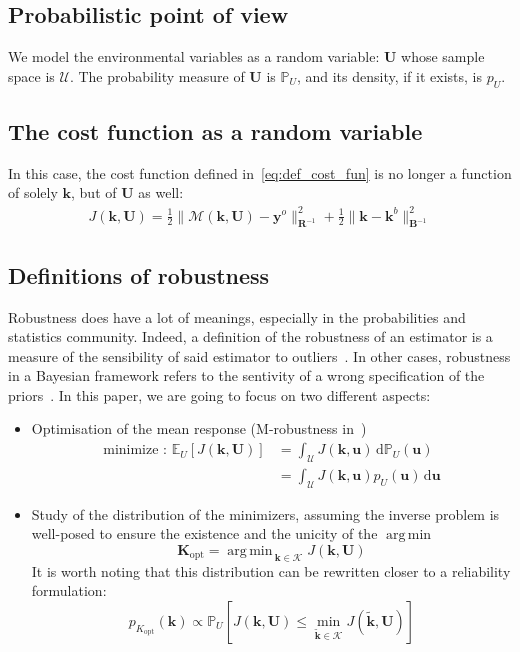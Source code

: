 \documentclass[npg]{copernicus}
\newcommand{\yobs}{\mathbf{y}^o}
\DeclareMathOperator*{\argmin}{arg\,min \,}
\newcommand{\Ex}{\mathbb{E}}
\newcommand{\Prob}{\mathbb{P}}
\begin{document}
\subsection{Probabilistic point of view}
We model the environmental variables as a random variable: $\mathbf{U}$ whose sample space is $\mathcal{U}$. The probability measure of $\mathbf{U}$ is $\Prob_U$, and its density, if it exists, is $p_U$.
\subsection{The cost function as a random variable}
In this case, the cost function defined in~\eqref{eq:def_cost_fun} is no longer a function of solely $\mathbf{k}$, but of $\mathbf{U}$ as well:
\begin{align}
  \label{eq:def_cost_fun_rnd}
  J(\mathbf{k},\mathbf{U}) = \frac12 \| \mathcal{M}(\mathbf{k},\mathbf{U}) - \yobs \|^2_{\mathbf{R}^{-1}} + \frac12\|\mathbf{k}-\mathbf{k}^b\|_{\mathbf{B}^{-1}}^2 
\end{align}

\subsection{Definitions of robustness}
Robustness does have a lot of meanings, especially in the probabilities and statistics community. Indeed, a definition of the robustness of an estimator is a measure of the sensibility of said estimator to outliers~\citep{huber_robust_2011}. In other cases, robustness in a Bayesian framework refers to the sentivity of a wrong specification of the priors~\citep{berger_overview_1994}.
In this paper, we are going to focus on two different aspects:
\begin{itemize}
\item Optimisation of the mean response (M-robustness in~\cite{lehman_designing_2004})
  \begin{align}
    \label{eq:def_opt_mean}
    \text{minimize : } \Ex_U\left[J(\mathbf{k},\mathbf{U})\right] &= \int_{\mathcal{U}} J(\mathbf{k},\mathbf{u}) \,\mathrm{d}\Prob_U(\mathbf{u})\\
                                                                  &= \int_{\mathcal{U}} J(\mathbf{k},\mathbf{u})p_U(\mathbf{u}) \,\mathrm{d}\mathbf{u}
  \end{align}
\item Study of the distribution of the minimizers, assuming the inverse problem is well-posed to ensure the existence and the unicity of the $\argmin$
  \begin{equation}
    \label{eq:def_study_minimizers}
    \mathbf{K}_{\mathrm{opt}}=\argmin_{\mathbf{k}\in\mathcal{K}} J(\mathbf{k},\mathbf{U}) 
  \end{equation}
  It is worth noting that this distribution can be rewritten closer to a reliability formulation:
  \begin{equation}
    \label{eq:def_Kopt_reliability}
    p_{K_{\mathrm{opt}}}(\mathbf{k}) \propto \Prob_U\left[J(\mathbf{k},\mathbf{U}) \leq \min_{\tilde{\mathbf{k}}\in\mathcal{K}}J(\tilde{\mathbf{k}},\mathbf{U}) \right]
  \end{equation}
\end{itemize}
\end{document}
